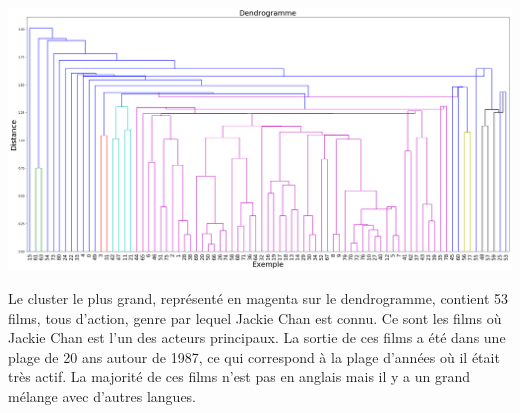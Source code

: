 \documentclass[10pt]{article}
\theoremstyle{plain}
\theoremstyle{definition}
\numberwithin{table}{section}
\numberwithin{figure}{section}
\numberwithin{equation}{section}
\begin{document}
\begin{center}
{\begin{minipage}{21cm}
\begin{multicols}{3}
\includegraphics[width=\columnwidth]{dendrogramme}

Le cluster le plus grand, représenté en magenta sur le dendrogramme, contient 53 films, tous d’action, genre par lequel Jackie Chan est connu. Ce sont les films où Jackie Chan est l’un des acteurs principaux. La sortie de ces films a été dans une plage de 20 ans autour de 1987, ce qui correspond à la plage d’années où il était très actif. La majorité de ces films n’est pas en anglais mais il y a un grand mélange avec d’autres langues.

\end{multicols}

\end{minipage}
}
\end{center}
\end{document}
